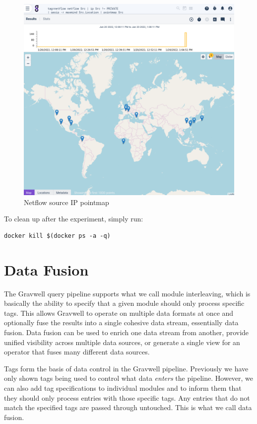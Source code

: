 \begin{figure}
	\includegraphics[width=0.7\linewidth]{images/maxmind-pointmap.png}
	\caption{Netflow source IP pointmap}
	\label{fig:maxmind-pointmap}
\end{figure}

To clean up after the experiment, simply run:

\begin{Verbatim}[breaklines=true]
docker kill $(docker ps -a -q)
\end{Verbatim}


\clearpage
\section{Data Fusion}
The Gravwell query pipeline supports what we call module interleaving,
which is basically the ability to specify that a given module should only process
specific tags. This allows Gravwell to operate on multiple data formats
at once and optionally fuse the results into a single cohesive data
stream, essentially data fusion. Data fusion can be used to enrich one
data stream from another, provide unified visibility across multiple
data sources, or generate a single view for an operator that fuses many
different data sources.

Tags form the basis of data control in the Gravwell pipeline.
Previously we have only shown tags being used
to control what data \emph{enters} the pipeline. However, we can also add tag
specifications to individual modules and to inform them that they should
only process entries with those specific tags. Any entries that do not
match the specified tags are passed through untouched. This is what we
call data fusion.

